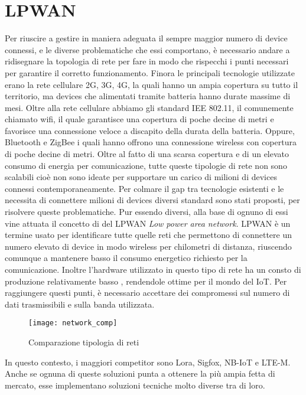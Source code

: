 \section{LPWAN}
Per riuscire a gestire in maniera adeguata il sempre maggior numero di device
connessi, e le diverse problematiche che essi comportano, è necessario andare a
ridisegnare la topologia di rete per fare in modo che rispecchi i punti necessari
per garantire il corretto funzionamento. Finora le principali tecnologie
utilizzate erano la rete cellulare 2G, 3G, 4G, la quali hanno un ampia copertura
su tutto il territorio, ma devices che alimentati tramite batteria hanno durate
massime di mesi. Oltre alla rete cellulare abbiamo gli standard IEE 802.11, il
comunemente chiamato wifi, il quale garantisce una copertura di poche decine di
metri e favorisce una connessione veloce a discapito della durata della
batteria. Oppure, Bluetooth e ZigBee i quali hanno offrono una connessione
wireless con copertura di poche decine di metri. Oltre al fatto di una scarsa
copertura e di un elevato consumo di energia per comunicazione, tutte queste
tipologie di rete non sono scalabili cioè non sono ideate per supportare un
carico di milioni di devices connessi contemporaneamente. Per colmare il gap tra
tecnologie esistenti e le necessita di connettere milioni di devices diversi
standard sono stati proposti, per risolvere queste problematiche. Pur essendo
diversi, alla base di ognuno di essi vine attuata il concetto di del LPWAN
\emph{Low power area network}. LPWAN è un termine usato per identificare tutte
quelle reti che permettono di connettere un numero elevato di device in modo
wireless per chilometri di distanza, riuscendo comunque a mantenere basso il
consumo energetico richiesto per la comunicazione. Inoltre l'hardware utilizzato
in questo tipo di rete ha un consto di produzione relativamente basso ,
rendendole ottime per il mondo del IoT. Per raggiungere questi punti, è
necessario accettare dei compromessi sul numero di dati trasmissibili e sulla
banda utilizzata. 

\begin{figure}[h]
        \centering 
                \texttt{[image: network\_comp]}
        \caption{Comparazione tipologia di reti}
\end{figure}

In questo contesto, i maggiori competitor sono Lora, Sigfox, NB-IoT e LTE-M.
Anche se ognuna di queste soluzioni punta a ottenere la più ampia fetta di
mercato, esse implementano soluzioni tecniche molto diverse tra di loro.
